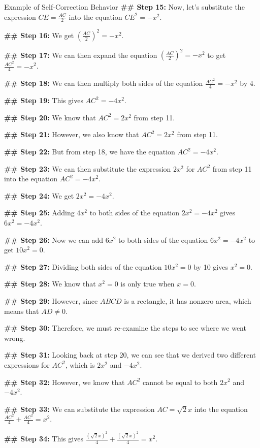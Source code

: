 \begin{promptbox}{Example of Self-Correction Behavior}
\textbf{\#\# Step 15:}
Now, let's substitute the expression $CE=\frac{AC}{2}$ into the equation $CE^2=-x^2$.

\textbf{\#\# Step 16:}
We get $\left(\frac{AC}{2}\right)^2=-x^2$.

\textbf{\#\# Step 17:}
We can then expand the equation $\left(\frac{AC}{2}\right)^2=-x^2$ to get $\frac{AC^2}{4}=-x^2$.

\textbf{\#\# Step 18:}
We can then multiply both sides of the equation $\frac{AC^2}{4}=-x^2$ by $4$.

\textbf{\#\# Step 19:}
This gives $AC^2=-4x^2$.

\textbf{\#\# Step 20:}
We know that $AC^2=2x^2$ from step 11.

\textbf{\#\# Step 21:}
However, we also know that $AC^2=2x^2$ from step 11.

\textbf{\#\# Step 22:}
But from step 18, we have the equation $AC^2=-4x^2$.

\textbf{\#\# Step 23:}
We can then substitute the expression $2x^2$ for $AC^2$ from step 11 into the equation $AC^2=-4x^2$.

\textbf{\#\# Step 24:}
We get $2x^2=-4x^2$.

\textbf{\#\# Step 25:}
Adding $4x^2$ to both sides of the equation $2x^2=-4x^2$ gives $6x^2=-4x^2$.

\textbf{\#\# Step 26:}
Now we can add $6x^2$ to both sides of the equation $6x^2=-4x^2$ to get $10x^2=0$.

\textbf{\#\# Step 27:}
Dividing both sides of the equation $10x^2=0$ by 10 gives $x^2=0$.

\textbf{\#\# Step 28:}
We know that $x^2=0$ is only true when $x=0$.

{\color{red}
\textbf{\#\# Step 29:}
However, since $ABCD$ is a rectangle, it has nonzero area, which means that $AD\ne0$.

\textbf{\#\# Step 30:}
Therefore, we must re-examine the steps to see where we went wrong.
}

\textbf{\#\# Step 31:}
Looking back at step 20, we can see that we derived two different expressions for $AC^2$, which is $2x^2$ and $-4x^2$.

\textbf{\#\# Step 32:}
However, we know that $AC^2$ cannot be equal to both $2x^2$ and $-4x^2$.

\textbf{\#\# Step 33:}
We can substitute the expression $AC=\sqrt{2}x$ into the equation $\frac{AC^2}{4}+\frac{AC^2}{4}=x^2$.

\textbf{\#\# Step 34:}
This gives $\frac{(\sqrt{2}x)^2}{4}+\frac{(\sqrt{2}x)^2}{4}=x^2$.


\end{promptbox}
